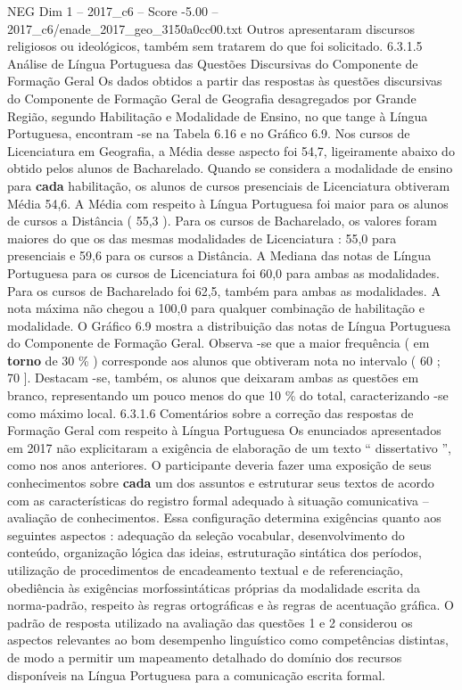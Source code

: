 \begin{textsample}{NEG Dim 1 – 2017\_c6 – Score -5.00 – 2017\_c6/enade\_2017\_geo\_3150a0cc00.txt}
Outros apresentaram discursos religiosos ou ideológicos, também sem tratarem do que foi solicitado. 6.3.1.5 Análise de Língua Portuguesa das Questões Discursivas do Componente de Formação Geral Os dados obtidos a partir das respostas às questões discursivas do Componente de Formação Geral de Geografia desagregados por Grande Região, segundo Habilitação e Modalidade de Ensino, no que tange à Língua Portuguesa, encontram -se na Tabela 6.16 e no Gráfico 6.9.
Nos cursos de Licenciatura em Geografia, a Média desse aspecto foi 54,7, ligeiramente abaixo do obtido pelos alunos de Bacharelado.
Quando se considera a modalidade de ensino para \textbf{cada} habilitação, os alunos de cursos presenciais de Licenciatura obtiveram Média 54,6.
A Média com respeito à Língua Portuguesa foi maior para os alunos de cursos a Distância ( 55,3 ).
Para os cursos de Bacharelado, os valores foram maiores do que os das mesmas modalidades de Licenciatura : 55,0 para presenciais e 59,6 para os cursos a Distância.
A Mediana das notas de Língua Portuguesa para os cursos de Licenciatura foi 60,0 para ambas as modalidades.
Para os cursos de Bacharelado foi 62,5, também para ambas as modalidades.
A nota máxima não chegou a 100,0 para qualquer combinação de habilitação e modalidade.
O Gráfico 6.9 mostra a distribuição das notas de Língua Portuguesa do Componente de Formação Geral.
Observa -se que a maior frequência ( em \textbf{torno} de 30 \% ) corresponde aos alunos que obtiveram nota no intervalo ( 60 ; 70 ].
Destacam -se, também, os alunos que deixaram ambas as questões em branco, representando um pouco menos do que 10 \% do total, caracterizando -se como máximo local. 6.3.1.6 Comentários sobre a correção das respostas de Formação Geral com respeito à Língua Portuguesa Os enunciados apresentados em 2017 não explicitaram a exigência de elaboração de um texto “ dissertativo ”, como nos anos anteriores.
O participante deveria fazer uma exposição de seus conhecimentos sobre \textbf{cada} um dos assuntos e estruturar seus textos de acordo com as características do registro formal adequado à situação comunicativa – avaliação de conhecimentos.
Essa configuração determina exigências quanto aos seguintes aspectos : adequação da seleção vocabular, desenvolvimento do conteúdo, organização lógica das ideias, estruturação sintática dos períodos, utilização de procedimentos de encadeamento textual e de referenciação, obediência às exigências morfossintáticas próprias da modalidade escrita da norma-padrão, respeito às regras ortográficas e às regras de acentuação gráfica.
O padrão de resposta utilizado na avaliação das questões 1 e 2 considerou os aspectos relevantes ao bom desempenho linguístico como competências distintas, de modo a permitir um mapeamento detalhado do domínio dos recursos disponíveis na Língua Portuguesa para a comunicação escrita formal.

\end{textsample}
